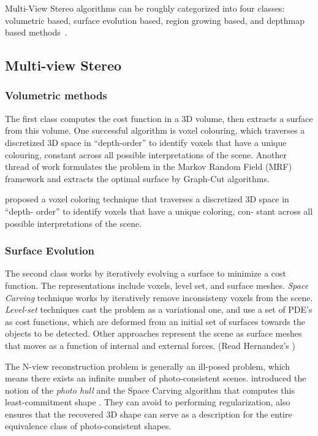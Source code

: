Multi-View Stereo algorithms can be roughly categorized into four classes: volumetric based, surface evolution based, region growing based, and depthmap based methods~\cite{seitz2006comparison}.

\subsection{Multi-view Stereo}
\subsubsection{Volumetric methods}
The first class computes the cost function in a 3D volume, then extracts a surface from this volume. One successful algorithm is voxel colouring, which traverses a discretized 3D space in “depth-order” to identify voxels that have a unique colouring, constant across all possible interpretations of the scene. Another thread of work formulates the problem in the Markov Random Field (MRF) framework and extracts the optimal surface by Graph-Cut algorithms.

\citeauthor{seitz2006comparison} proposed a voxel coloring technique that traverses a discretized 3D space in “depth- order” to identify voxels that have a unique coloring, con- stant across all possible interpretations of the scene.


\subsubsection{Surface Evolution}
The second class works by iteratively evolving a surface to minimize a cost function. The representations include voxels, level set, and surface meshes. \textit{Space Carving} technique works by iteratively remove inconsisteny voxels from the scene. \textit{Level-set} techniques cast the problem as a variational one, and use a set of PDE's as cost functions, which are deformed from an initial set of surfaces towards the objects to be detected. Other approaches represent the scene as surface meshes that moves as a function of internal and external forces. (Read Hernandez's \cite{esteban2004silhouette})

The N-view reconstruction problem is generally an ill-posed problem, which means there exists an infinite number of photo-consistent scenes. \citeauthor{kutulakos2000theory} introduced the notion of the \textit{photo hull} and the Space 
Carving algorithm that computes this least-commitment shape \cite{marr1982vision}. They can avoid to performing regularization, also ensures that the recovered 3D shape can serve as a description for the entire equivalence class of photo-consistent shapes.

